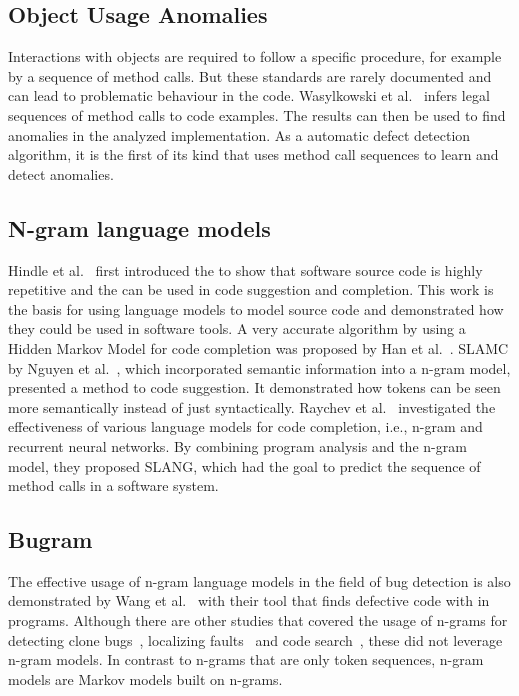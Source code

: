 \subsection{Object Usage Anomalies}
Interactions with objects are required to follow a specific procedure, for example by a sequence of method calls. But these standards are rarely documented and can lead to problematic behaviour in the code. Wasylkowski et al.~\cite{object_usage} infers legal sequences of method calls to code examples. The results can then be used to find anomalies in the analyzed implementation. As a automatic defect detection algorithm, it is the first of its kind that uses method call sequences to learn and detect anomalies.

\subsection{N-gram language models}\label{sec:language-models}
Hindle et al.~\cite{naturalness} first introduced the \ngram{} to show that software source code is highly repetitive and the \ngram{} can be used in code suggestion and completion. This work is the basis for using language models to model source code and demonstrated how they could be used in software tools. A very accurate algorithm by using a Hidden Markov Model for code completion was proposed by Han et al.~\cite{codecompletion}. SLAMC by Nguyen et al.~\cite{SLAMC}, which incorporated semantic information into a n-gram model, presented a method to code suggestion. It demonstrated how tokens can be seen more semantically instead of just syntactically. Raychev et al.~\cite{SLANG} investigated the effectiveness of various language models for code completion, i.e., n-gram and recurrent neural networks. By combining program analysis and the n-gram model, they proposed SLANG, which had the goal to predict the sequence of method calls in a software system. 

\subsection{Bugram}
The effective usage of n-gram language models in the field of bug detection is also demonstrated by Wang et al.~\cite{bugram} with their tool \bugram{} that finds defective code with  in \java{} programs. Although there are other studies that covered the usage of n-grams for detecting clone bugs~\cite{clonebugs}, localizing faults~\cite{faults} and code search~\cite{codesearch}, these did not leverage n-gram models. In contrast to n-grams that are only token sequences, n-gram models are Markov models built on n-grams.